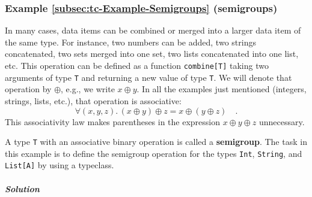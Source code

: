 \subsubsection{Example \label{subsec:tc-Example-Semigroups}\ref{subsec:tc-Example-Semigroups}
(semigroups)}

In many cases, data items can be combined or merged into a larger
data item of the same type. For instance, two numbers can be added,
two strings concatenated, two sets merged into one set, two lists
concatenated into one list, etc. This operation can be defined as
a function \lstinline!combine[T]! taking two arguments of type \lstinline!T!
and returning a new value of type \lstinline!T!. We will denote that
operation by $\oplus$, e.g., we write $x\oplus y$. In all the examples
just mentioned (integers, strings, lists, etc.), that operation is
associative:
\begin{equation}
\forall(x,y,z).\,\left(x\oplus y\right)\oplus z=x\oplus\left(y\oplus z\right)\quad.\label{eq:associativity-law-semigroup}
\end{equation}
This associativity law makes
parentheses in the expression $x\oplus y\oplus z$ unnecessary.

A type \lstinline!T! with an associative binary operation is called
a \textbf{semigroup}.
The task in this example is to define the semigroup operation for
the types \lstinline!Int!, \lstinline!String!, and \lstinline!List[A]!
by using a typeclass.

\subparagraph{Solution}

